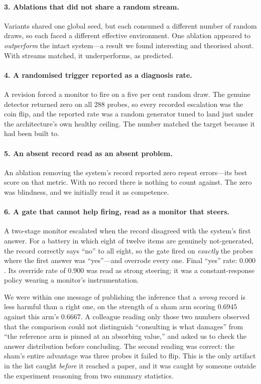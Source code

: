 \documentclass[11pt]{article}
\begin{document}
\paragraph{3. Ablations that did not share a random stream.}
Variants shared one global seed, but each consumed a different number of random
draws, so each faced a different effective environment. One ablation appeared
to \emph{outperform} the intact system---a result we found interesting and
theorised about. With streams matched, it underperforms, as predicted.

\paragraph{4. A randomised trigger reported as a diagnosis rate.}
A revision forced a monitor to fire on a five per cent random draw. The genuine
detector returned zero on all 288 probes, so every recorded escalation was the
coin flip, and the reported rate was a random generator tuned to land just
under the architecture's own healthy ceiling. The number matched the target
because it had been built to.

\paragraph{5. An absent record read as an absent problem.}
An ablation removing the system's record reported zero repeat errors---its best
score on that metric. With no record there is nothing to count against. The
zero was blindness, and we initially read it as competence.

\paragraph{6. A gate that cannot help firing, read as a monitor that steers.}
A two-stage monitor escalated when the record disagreed with the system's first
answer. For a battery in which eight of twelve items are genuinely
not-generated, the record correctly says ``no'' to all eight, so the gate fired
on \emph{exactly} the probes where the first answer was ``yes''---and overrode
every one. Final ``yes'' rate: $0.000$. Its override rate of $0.900$ was read
as strong steering; it was a constant-response policy wearing a monitor's
instrumentation.

We were within one message of publishing the inference that a \emph{wrong}
record is less harmful than a right one, on the strength of a sham arm scoring
$0.6945$ against this arm's $0.6667$. A colleague reading only those two
numbers observed that the comparison could not distinguish ``consulting is what
damages'' from ``the reference arm is pinned at an absorbing value,'' and asked
us to check the answer distribution before concluding. The second reading was
correct: the sham's entire advantage was three probes it failed to flip. This
is the only artifact in the list caught \emph{before} it reached a paper, and it
was caught by someone outside the experiment reasoning from two summary
statistics.
\end{document}
